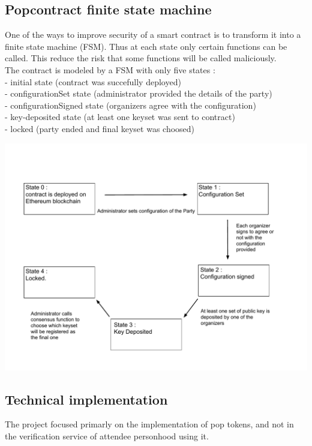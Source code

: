 \documentclass[11pt, a4paper, twoside, openright]{book} %
\begin{document}
\subsection{Popcontract finite state machine}
One of the ways to improve security of a smart contract is to transform it into a finite state machine (FSM). Thus at each state only certain functions can be called. This reduce the risk that some functions will be called maliciously.\\ The contract is modeled by a FSM with only five states : \\- initial state (contract was succefully deployed)\\ - configurationSet state (administrator provided the details of the party) \\ - configurationSigned state (organizers agree with the configuration) \\ - key-deposited state (at least one keyset was sent to contract)\\ - locked (party ended and final keyset was choosed)

\begin{minipage}{1\linewidth}
    \includegraphics[scale = 0.67]{fsm.pdf}
\end{minipage}%

\subsection{Technical implementation}
The project focused primarly on the implementation of pop tokens, and not in the verification service of attendee personhood using it.
\end{document}
